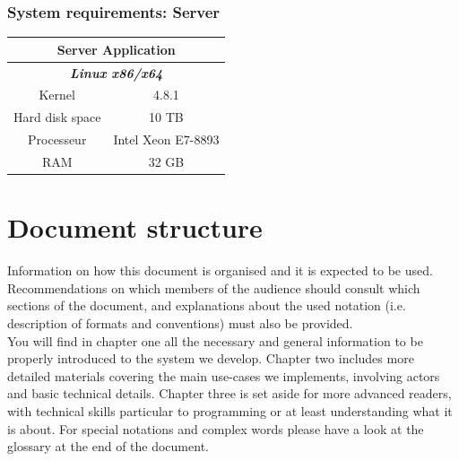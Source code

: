 \subsubsection{System requirements: Server}
\begin{tabular}{|c|c|}
\hline
\multicolumn{2}{|c|}{\textbf{Server Application}} \\
\hline
\multicolumn{2}{|c|}{\textit{\textbf{Linux x86/x64}}} \\
\hline
Kernel & 4.8.1 \\
\hline
Hard disk space & 10 TB   \\
\hline
Processeur & Intel Xeon E7-8893 \\
\hline
RAM & 32 GB \\
\hline
\end{tabular}

\section{Document structure}  
Information on how this document is organised and it is expected to be
used. Recommendations on which members of the audience
should consult which sections of the document, and explanations about the used
notation (i.e. description of formats and conventions) must also be provided.\\

You will find in chapter one all the necessary and general information to be properly introduced
to the system we develop. Chapter two includes more detailed materials covering the main
use-cases we implements, involving actors and basic technical details. Chapter three is set
aside for more advanced readers, with technical skills particular to programming or at least
understanding what it is about.
For special notations and complex words please have a look at the glossary at the end of the
document.\\






